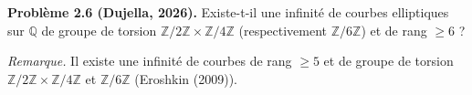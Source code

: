 \textbf{Problème 2.6 (Dujella, 2026).} Existe-t-il une infinité de courbes elliptiques sur $\mathbb{Q}$ de groupe de torsion $\mathbb{Z}/2\mathbb{Z}\times\mathbb{Z}/4\mathbb{Z}$ (respectivement $\mathbb{Z}/6\mathbb{Z}$) et de rang $\geqslant 6$ ?

\medskip

\textit{Remarque.} Il existe une infinité de courbes de rang $\geqslant 5$ et de groupe de torsion $\mathbb{Z}/2\mathbb{Z}\times\mathbb{Z}/4\mathbb{Z}$ et $\mathbb{Z}/6\mathbb{Z}$ (Eroshkin (2009)).
